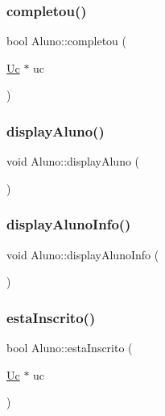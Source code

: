 \subsubsection{\texorpdfstring{completou()}{completou()}}
{\footnotesize\ttfamily bool Aluno\+::completou (\begin{DoxyParamCaption}\item[{\hyperlink{class_uc}{Uc} $\ast$}]{uc }\end{DoxyParamCaption})}

\hypertarget{class_aluno_aee32fb416fb5164c9b474a163b55977a}{}\label{class_aluno_aee32fb416fb5164c9b474a163b55977a} 
\subsubsection{\texorpdfstring{display\+Aluno()}{displayAluno()}}
{\footnotesize\ttfamily void Aluno\+::display\+Aluno (\begin{DoxyParamCaption}{ }\end{DoxyParamCaption})}

\hypertarget{class_aluno_a32eabc2f1bb3a3a7f03e048210bc47cd}{}\label{class_aluno_a32eabc2f1bb3a3a7f03e048210bc47cd} 
\subsubsection{\texorpdfstring{display\+Aluno\+Info()}{displayAlunoInfo()}}
{\footnotesize\ttfamily void Aluno\+::display\+Aluno\+Info (\begin{DoxyParamCaption}{ }\end{DoxyParamCaption})}

\hypertarget{class_aluno_ab1c56db2906bb038c877a1078358b1b8}{}\label{class_aluno_ab1c56db2906bb038c877a1078358b1b8} 
\subsubsection{\texorpdfstring{esta\+Inscrito()}{estaInscrito()}}
{\footnotesize\ttfamily bool Aluno\+::esta\+Inscrito (\begin{DoxyParamCaption}\item[{\hyperlink{class_uc}{Uc} $\ast$}]{uc }\end{DoxyParamCaption})}

